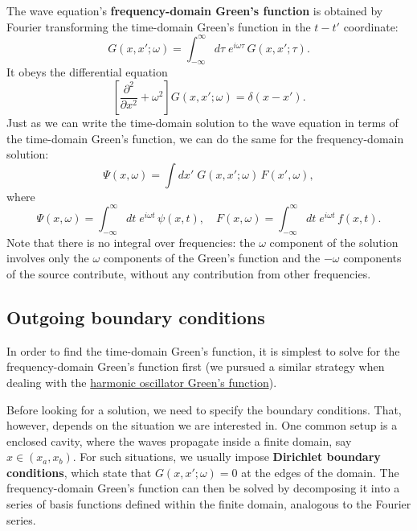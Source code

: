 \documentclass[10pt,a4paper]{article}
\begin{document}
The wave equation's \textbf{frequency-domain Green's function} is
obtained by Fourier transforming the time-domain Green's function in
the $t-t'$ coordinate:
\begin{equation}
  G(x,x';\omega) = \int_{-\infty}^\infty d\tau\; e^{i\omega \tau}\, G(x,x'; \tau).
\end{equation}
It obeys the differential equation
\begin{equation}
  \left[\frac{\partial^2}{\partial x^2} + \omega^2 \right]
  G(x,x';\omega) = \delta(x-x').
\end{equation}
Just as we can write the time-domain solution to the wave equation in
terms of the time-domain Green's function, we can do the same for the
frequency-domain solution:
\begin{equation}
  \Psi(x,\omega) = \int dx' \; G(x,x';\omega) \, F(x', \omega),
\end{equation}
where
\begin{equation}
  \Psi(x,\omega) = \int_{-\infty}^\infty dt \; e^{i\omega t} \, \psi(x,t),
  \quad F(x,\omega) = \int_{-\infty}^\infty dt \; e^{i\omega t} \, f(x,t).
\end{equation}
Note that there is no integral over frequencies: the $\omega$
component of the solution involves only the $\omega$ components of the
Green's function and the $-\omega$ components of the source
contribute, without any contribution from other frequencies.

\subsection{Outgoing boundary conditions}
\label{outgoing-boundary-conditions}

In order to find the time-domain Green's function, it is simplest to
solve for the frequency-domain Green's function first (we pursued a
similar strategy when dealing with the
\hyperref[driven-oscillator]{harmonic oscillator Green's function}).

Before looking for a solution, we need to specify the boundary
conditions. That, however, depends on the situation we are interested
in. One common setup is a enclosed cavity, where the waves propagate
inside a finite domain, say $x \in (x_a,x_b)$. For such situations, we
usually impose \textbf{Dirichlet boundary conditions}, which state
that $G(x,x';\omega) = 0$ at the edges of the domain. The
frequency-domain Green's function can then be solved by decomposing it
into a series of basis functions defined within the finite domain,
analogous to the Fourier series.
\end{document}

